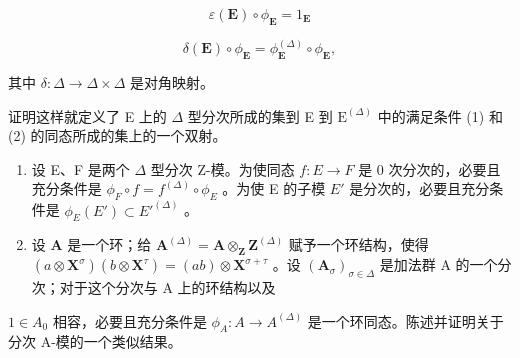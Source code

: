 \[
\varepsilon (\mathbf {E}) \circ \phi_ {\mathbf {E}} = 1 _ {\mathbf {E}}\tag{1}
\]

\[
\delta (\mathbf {E}) \circ \phi_ {\mathbf {E}} = \phi_ {\mathbf {E}} ^ {(\Delta)} \circ \phi_ {\mathbf {E}},\tag{2}
\]

其中 \(\delta: \Delta \to \Delta \times \Delta\) 是对角映射。

证明这样就定义了 E 上的 \(\Delta\) 型分次所成的集到 E 到 \(\mathrm{E}^{(\Delta)}\) 中的满足条件 (1) 和 (2) 的同态所成的集上的一个双射。

\begin{enumerate}
\def\labelenumi{(\alph{enumi})}
\setcounter{enumi}{1}
\item
  设 E、F 是两个 \(\Delta\) 型分次 Z-模。为使同态 \(f: E \to F\) 是 0 次分次的，必要且充分条件是 \(\phi_{F} \circ f = f^{(\Delta)} \circ \phi_{E}\) 。为使 E 的子模 \(E'\) 是分次的，必要且充分条件是 \(\phi_{E}(E') \subset E'^{(\Delta)}\) 。
\item
  设 \(\mathbf{A}\) 是一个环；给 \(\mathbf{A}^{(\Delta)} = \mathbf{A} \otimes_{\mathbf{Z}} \mathbf{Z}^{(\Delta)}\) 赋予一个环结构，使得 \((a \otimes \mathbf{X}^{\sigma})(b \otimes \mathbf{X}^{\tau}) = (ab) \otimes \mathbf{X}^{\sigma + \tau}\) 。设 \((\mathbf{A}_{\sigma})_{\sigma \in \Delta}\) 是加法群 A 的一个分次；对于这个分次与 A 上的环结构以及
\end{enumerate}

\(1 \in A_{0}\) 相容，必要且充分条件是 \(\phi_{A}: A \to A^{(\Delta)}\) 是一个环同态。陈述并证明关于分次 A-模的一个类似结果。

